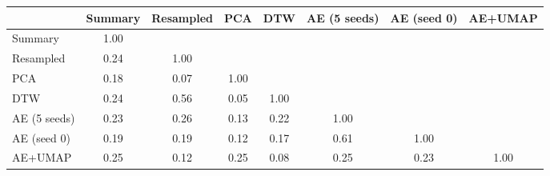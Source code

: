 \begin{tabular}{lccccccc}\toprule
 & Summary & Resampled & PCA & DTW & AE (5 seeds) & AE (seed 0) & AE+UMAP \\ \midrule
Summary & 1.00 &  &  &  &  &  &  \\
Resampled & 0.24 & 1.00 &  &  &  &  &  \\
PCA & 0.18 & 0.07 & 1.00 &  &  &  &  \\
DTW & 0.24 & 0.56 & 0.05 & 1.00 &  &  &  \\
AE (5 seeds) & 0.23 & 0.26 & 0.13 & 0.22 & 1.00 &  &  \\
AE (seed 0) & 0.19 & 0.19 & 0.12 & 0.17 & 0.61 & 1.00 &  \\
AE+UMAP & 0.25 & 0.12 & 0.25 & 0.08 & 0.25 & 0.23 & 1.00 \\
\bottomrule\end{tabular}